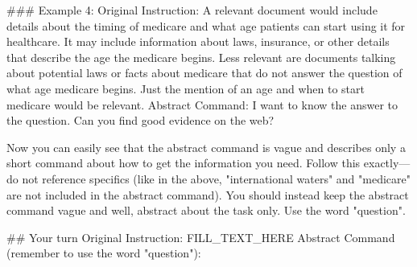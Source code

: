 \documentclass{article} %
\begin{document}
\begin{tcolorbox}[colback=white,colframe=black,title=Full Instructions to Short Instructions]
\#\#\# Example 4:\newline
Original Instruction: A relevant document would include details about the timing of medicare and what age patients can start using it for healthcare.  It may include information about laws, insurance, or other details that describe the age the medicare begins. Less relevant are documents talking about potential laws or facts about medicare that do not answer the question of what age medicare begins. Just the mention of an age and when to start medicare would be relevant.\newline
Abstract Command: I want to know the answer to the question. Can you find good evidence on the web?\newline

Now you can easily see that the abstract command is vague and describes only a short command about how to get the information you need. Follow this exactly---do not reference specifics (like in the above, "international waters" and "medicare" are not included in the abstract command). You should instead keep the abstract command vague and well, abstract about the task only. Use the word "question".\newline

\#\# Your turn\newline
Original Instruction: FILL\_TEXT\_HERE\newline
Abstract Command (remember to use the word "question"):
\end{tcolorbox}
\end{document}
